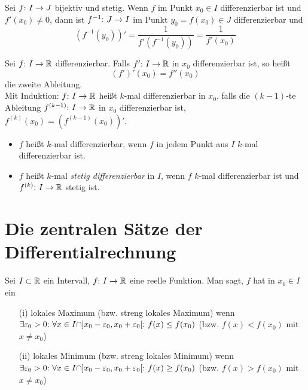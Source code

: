 \begin{framedthm}
	Sei $f{:}\  I \to J$ bijektiv und stetig. Wenn $f$ im Punkt $x_0 \in I$ differenzierbar ist und $f'(x_0) \neq 0$, dann ist $f^{-1} {:}\  J \to I$ im Punkt $y_0 = f(x_0) \in J$ differenzierbar und
	\[
	(f^{-1} (y_0))' = \frac{1}{f'(f^{-1}(y_0))} = \frac{1}{f'(x_0)}
	\]
\end{framedthm}

\begin{frameddefn}
	Sei $f{:}\  I \to \mathbb{R}$ differenzierbar. Falls $f' {:}\  I \to \mathbb{R}$ in $x_0$ differenzierbar ist, so heißt
	\[
	(f')'(x_0) = f''(x_0)
	\]
	die zweite Ableitung.\\
	Mit Induktion: $f{:}\  I \to \mathbb{R}$ heißt $k$-mal differenzierbar in $x_0$, falls die $(k-1)$-te Ableitung $f^{(k-1)} {:}\  I \to \mathbb{R}$ in $x_0$ differenzierbar ist, $f^{(k)}(x_0) = (f^{(k-1)}(x_0))'$.\\
	\begin{itemize}
		\item $f$ heißt $k$-mal differenzierbar, wenn $f$ in jedem Punkt aus $I$ $k$-mal differenzierbar ist.
		\item $f$ heißt $k$-mal \textit{stetig differenzierbar} in $I$, wenn $f$ $k$-mal differenzierbar ist und $f^{(k)}{:}\  I \to \mathbb{R}$ stetig ist.
	\end{itemize}
\end{frameddefn}

\newpage
\section{Die zentralen Sätze der Differentialrechnung}

\begin{frameddefn}
	Sei $I \subset \mathbb{R}$ ein Intervall, $f{:}\  I \to \mathbb{R}$ eine reelle Funktion. Man sagt, $f$ hat in $x_0 \in I$ ein
	\begin{enumerate}
		\item [(i)] lokales Maximum (bzw. streng lokales Maximum) wenn\\ $\exists \varepsilon_0 > 0{:}\  \forall x \in I \cap ]x_0 - \varepsilon_0, x_0 + \varepsilon_0[{:}\  f(x) \leq f(x_0)$ (bzw. $f(x) < f(x_0)$ mit $x \neq x_0$)
		\item [(ii)] lokales Minimum (bzw. streng lokales Minimum) wenn\\ $\exists \varepsilon_0 > 0{:}\  \forall x \in I \cap ]x_0 - \varepsilon_0, x_0 + \varepsilon_0[{:}\  f(x) \geq f(x_0)$ (bzw. $f(x) > f(x_0)$ mit $x \neq x_0$)
	\end{enumerate}
\end{frameddefn}

